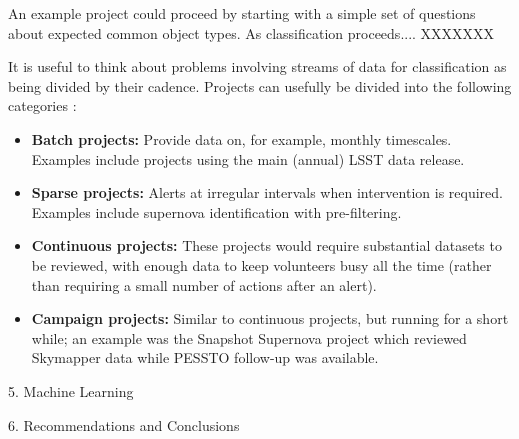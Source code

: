An example project could proceed by starting with a simple set of questions about expected common object types. As classification proceeds.... XXXXXXX

It is useful to think about problems involving streams of data for classification as being divided by their cadence. Projects can usefully be divided into the following categories :

\begin{itemize}

\item \textbf{Batch projects:} Provide data on, for example, monthly timescales. Examples include projects using the main (annual) LSST data release.

\item \textbf{Sparse projects:} Alerts at irregular intervals when intervention is required. Examples include supernova identification with pre-filtering. 

\item \textbf{Continuous projects:} These projects would require substantial datasets to be reviewed, with enough data to keep volunteers busy all the time (rather than requiring a small number of actions after an alert). 

\item \textbf{Campaign projects:} Similar to continuous projects, but running for a short while; an example was the Snapshot Supernova project which reviewed Skymapper data while PESSTO follow-up was available. 

\end{itemize}



5. Machine Learning

6. Recommendations and Conclusions

